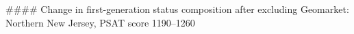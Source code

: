 #### Change in first-generation status composition after excluding Geomarket: Northern New Jersey, PSAT score 1190–1260
